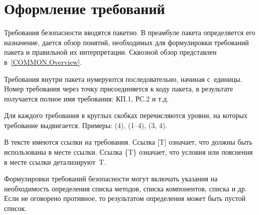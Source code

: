 \section{Оформление требований}\label{COMMON.Notation}

Требования безопасности вводятся пакетно. В преамбуле пакета определяется 
его назначение, дается обзор понятий, необходимых для формулировки 
требований пакета и правильной их интерпретации.
%
Сквозной обзор представлен в~\ref{COMMON.Overview}.

Требования внутри пакета нумеруются последовательно, начиная с~единицы.
%
Номер требования через точку присоединяется к коду пакета, 
в результате получается полное имя требования: КП.1, РС.2 и т.д.

Для каждого требования в круглых скобках перечисляются уровни, 
на которых требование выдвигается.
Примеры: (4), (1--4), (3, 4).

В тексте имеются ссылки на требования. Ссылка [T] означает, что 
 должны быть использованы в месте 
ссылки.
%
Ссылка \{T\} означает, что условия или пояснения в месте ссылки детализируют~T. 

Формулировки требований безопасности могут включать указания на 
необходимость определения списка методов, списка компонентов, 
списка  и др.
%
Если не оговорено противное, то результатом определения 
может быть пустой список.
